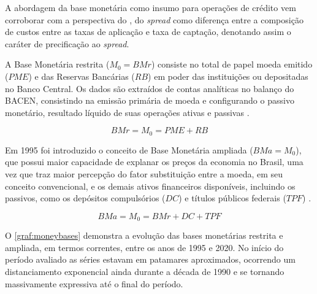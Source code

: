 \documentclass[
  12pt,
  12pt,
  openright,
  oneside,
  a4paper,
  chapter=TITLE,
  section=TITLE,
  subsection=TITLE,
  subsubsection=TITLE,
  english,
  portugues,
  sumario=tradicional]{abntex2}
\begin{document}
A abordagem da base monetária como insumo para operações de crédito vem corroborar com a perspectiva do \cite{bacen:juros:1999}, do \emph{spread} como diferença entre a composição de custos entre as taxas de aplicação e taxa de captação, denotando assim o caráter de precificação ao \emph{spread}.

A Base Monetária restrita (\(M_0 = BMr\)) consiste no total de papel moeda emitido (\(PME\)) e das Reservas Bancárias (\(RB\)) em poder das instituições ou depositadas no Banco Central. Os dados são extraídos de contas analíticas no balanço do BACEN, consistindo na emissão primária de moeda e configurando o passivo monetário, resultado líquido de suas operações ativas e passivas \cite{bcb:2019}.

\begin{equation}
BMr = M_0 = PME + RB
\end{equation}

Em 1995 foi introduzido o conceito de Base Monetária ampliada (\(BMa = M_0\)), que possui maior capacidade de explanar os preços da economia no Brasil, uma vez que traz maior percepção do fator substituição entre a moeda, em seu conceito convencional, e os demais ativos financeiros disponíveis, incluindo os passivos, como os depósitos compulsórios (\(DC\)) e títulos públicos federais (\(TPF\)) \cite{bcb:2019}.

\begin{equation}
BMa = M_0 = BMr + DC +  TPF
\end{equation}

O \autoref{graf:moneybases} demonstra a evolução das bases monetárias restrita e ampliada, em termos correntes, entre os anos de 1995 e 2020. No início do período avaliado as séries estavam em patamares aproximados, ocorrendo um distanciamento exponencial ainda durante a década de 1990 e se tornando massivamente expressiva até o final do período.
\end{document}
